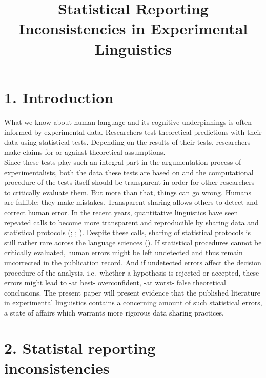 \documentclass[
  doc,
  longtable,
  nolmodern,
  notxfonts,
  notimes,
  colorlinks=true,linkcolor=blue,citecolor=blue,urlcolor=blue]{apa7}
\title{Statistical Reporting Inconsistencies in Experimental
Linguistics}
\affiliation{
{Department of Linguistics \& Scandinavian Studies, University of Oslo}}
\begin{document}
\maketitle


\setcounter{secnumdepth}{-\maxdimen} %

\setlength\LTleft{0pt}


\section{1. Introduction}\label{introduction}

What we know about human language and its cognitive underpinnings is
often informed by experimental data. Researchers test theoretical
predictions with their data using statistical tests. Depending on the
results of their tests, researchers make claims for or against
theoretical assumptions.\\
Since these tests play such an integral part in the argumentation
process of experimentalists, both the data these tests are based on and
the computational procedure of the tests itself should be transparent in
order for other researchers to critically evaluate them. But more than
that, things can go wrong. Humans are fallible; they make mistakes.
Transparent sharing allows others to detect and correct human error. In
the recent years, quantitative linguistics have seen repeated calls to
become more transparent and reproducible by sharing data and statistical
protocols (;
;
). Despite these
calls, sharing of statistical protocols is still rather rare across the
language sciences (). If statistical procedures cannot be critically evaluated,
human errors might be left undetected and thus remain uncorrected in the
publication record. And if undetected errors affect the decision
procedure of the analysis, i.e.~whether a hypothesis is rejected or
accepted, these errors might lead to -at best- overconfident, -at worst-
false theoretical conclusions. The present paper will present evidence
that the published literature in experimental linguistics contains a
concerning amount of such statistical errors, a state of affairs which
warrants more rigorous data sharing practices.

\section{2. Statistal reporting
inconsistencies}\label{statistal-reporting-inconsistencies}
\end{document}
